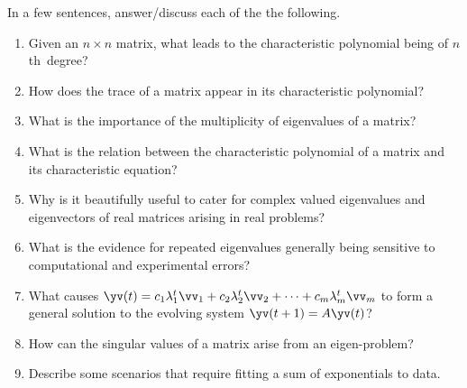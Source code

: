










\begin{exercise} 
In a few sentences, answer\slash discuss each of the the following.
\begin{enumerate}
\item  Given an \(n\times n\) matrix, what leads to the characteristic polynomial being of \(n\)th~degree?

\item How does the trace of a matrix appear in its characteristic polynomial?

\item What is the importance of the multiplicity of eigenvalues of a matrix?

\item What is the relation between the characteristic polynomial of a matrix and its characteristic equation?

\item Why is it beautifully useful to cater for complex valued eigenvalues and eigenvectors of real matrices arising in real problems?

\item What is the evidence for repeated eigenvalues generally being sensitive to computational and experimental errors?

\item What causes \(\yv(t)=c_1\lambda_1^t\vv_1+c_2\lambda_2^t\vv_2+\cdots+c_m\lambda_m^t\vv_m\) to form a general solution to the evolving system \(\yv(t+1)=A\yv(t)\)?

\item How can the singular values of a matrix arise from an eigen-problem?

\item Describe some scenarios that require fitting a sum of exponentials to data.

\end{enumerate}
\end{exercise}

